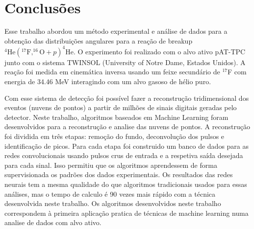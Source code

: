 \documentclass[a4paper,12pt,oneside]{book}
\begin{document}
%
%

\chapter{Conclusões}\label{chapter:conclusao}

\par Esse trabalho abordou um método experimental e análise de dados para a obtenção das distribuições angulares para a reação de breakup $^4\mathrm{He}(^{17}\mathrm{F},^{16}\mathrm{O}+p)^4\mathrm{He}$. O experimento foi realizado com o alvo ativo pAT-TPC junto com o sistema TWINSOL (University of Notre Dame, Estados Unidos). A reação foi medida em cinemática inversa usando um feixe secundário de $^{17}$F com energia de 34.46 MeV interagindo com um alvo gasoso de hélio puro.

\par Com esse sistema de detecção foi possível fazer a reconstrução tridimensional dos eventos (nuvens de pontos) a partir de milhões de sinais digitais geradas pelo detector. Neste trabalho, algoritmos baseados em Machine Learning foram desenvolvidos para a reconstrução e analise das nuvens de pontos. A reconstrução foi dividida em três etapas: remoção do fundo, deconvolução dos pulsos e identificação de picos. Para cada etapa foi construido um banco de dados para as redes convolucionais usando pulsos crus de entrada e a respetiva saída desejada para cada sinal. Isso permitiu que os algoritmos aprendessem de forma supervisionada os padrões dos dados experimentais. Os resultados das redes neurais  tem a mesma qualidade do que algoritmos tradicionais usados para essas análises, mas o tempo de calculo é 90 vezes mais rápido com a técnica desenvolvida neste trabalho. Os algoritmos desenvolvidos neste trabalho correspondem à primeira aplicação pratica de técnicas de machine learning numa analise de dados com alvo ativo.
\end{document}
